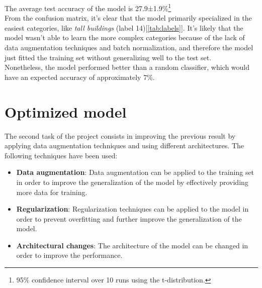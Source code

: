 \documentclass[a4paper, 11pt]{article}
\begin{document}
The average test accuracy of the model is 27.9±1.9\%\footnote{95\% confidence interval over 10 runs using the t-distribution.}\\
From the confusion matrix, it's clear that the model primarily specialized in the easiest categories,
like \textit{tall buildings} (label 14)[\ref{tab:labels}]. It's likely that the model wasn't able to learn
the more complex categories because of the lack of data augmentation techniques and batch normalization, 
and therefore the model just fitted the training set without generalizing well to the test set.\\
Nonetheless, the model performed better than a random classifier, which would have an expected accuracy of approximately 7\%.

\section{Optimized model}
The second task of the project consists in improving the previous result by applying data augmentation
techniques and using different architectures. The following techniques have been used:

\begin{itemize}
    \item \textbf{Data augmentation}: Data augmentation can be applied to the training set in order to improve the generalization of the model by effectively providing more data for training.
    \item \textbf{Regularization}: Regularization techniques can be applied to the model in order to prevent overfitting and further improve the generalization of the model.
    \item \textbf{Architectural changes}: The architecture of the model can be changed in order to improve the performance.
\end{itemize}
\end{document}
